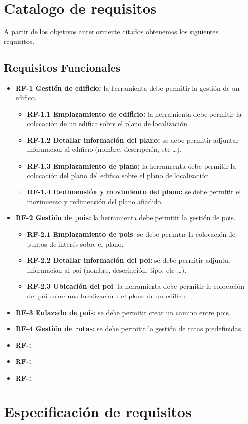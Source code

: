 \section{Catalogo de requisitos}
A partir de los objetivos anteriormente citados obtenemos los siguientes requisitos.

\subsection{Requisitos Funcionales}

\begin{itemize}
\item
\textbf{RF-1 Gestión de edificio:} la herramienta debe permitir la gestión de un edifico.
\begin{itemize}
	\item
	\textbf{RF-1.1 Emplazamiento de edificio:} la herramienta debe permitir la colocación de un edifico sobre el plano de localización
	\item
	\textbf{RF-1.2 Detallar información del plano:} se debe permitir adjuntar información al edificio (nombre, descripción, etc			\ldots).
	\item
	\textbf{RF-1.3 Emplazamiento de plano:} la herramienta debe permitir la colocación del plano del edifico sobre el plano de 			localización.
	\item
	\textbf{RF-1.4 Redimensión y movimiento del plano:} se debe permitir el movimiento y redimensión del plano añadido.
\end{itemize}
\item
\textbf{RF-2 Gestión de pois:} la herramienta debe permitir la gestión de pois.
\begin{itemize}
	\item
	\textbf{RF-2.1 Emplazamiento de pois:} se debe permitir la colocación de puntos de interés sobre el plano.
	\item
	\textbf{RF-2.2 Detallar información del poi:} se debe permitir adjuntar información al poi (nombre, descripción, tipo, etc			\ldots).
	\item
	\textbf{RF-2.3 Ubicación del poi:} la herramienta debe permitir la colocación del poi sobre una localización del plano de un edifico.
\end{itemize}
\item
\textbf{RF-3 Enlazado de pois:} se debe permitir crear un camino entre pois.
\item
\textbf{RF-4 Gestión de rutas:} se debe permitir la gestión de rutas predefinidas.
\item
\textbf{RF-:}
\item
\textbf{RF-:}
\item
\textbf{RF-:}
\end{itemize}

\section{Especificación de requisitos}


